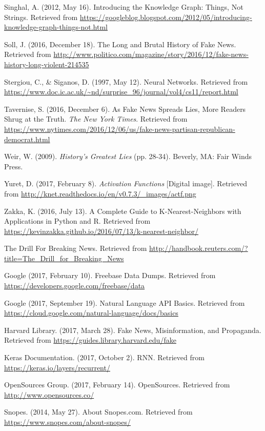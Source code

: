 \begin{thebibliography}{99}
Singhal, A. (2012, May 16). Introducing the Knowledge Graph: Things, Not Strings. Retrieved from \url{https://googleblog.blogspot.com/2012/05/introducing-knowledge-graph-things-not.html}

Soll, J. (2016, December 18). The Long and Brutal History of Fake News. Retrieved from \url{http://www.politico.com/magazine/story/2016/12/fake-news-history-long-violent-214535}

Stergiou, C., \& Siganos, D. (1997, May 12). Neural Networks. Retrieved from \url{https://www.doc.ic.ac.uk/~nd/surprise\_96/journal/vol4/cs11/report.html}

Tavernise, S. (2016, December 6). As Fake News Spreads Lies, More Readers Shrug at the Truth. \textit{The New York Times}. Retrieved from \url{https://www.nytimes.com/2016/12/06/us/fake-news-partisan-republican-democrat.html}

Weir, W. (2009). \textit{History's Greatest Lies} (pp. 28-34). Beverly, MA: Fair Winds Press.

Yuret, D. (2017, February 8). \textit{Activation Functions} [Digital image]. Retrieved from \url{http://knet.readthedocs.io/en/v0.7.3/\_images/actf.png}

Zakka, K. (2016, July 13). A Complete Guide to K-Nearest-Neighbors with Applications in Python and R. Retrieved from \url{https://kevinzakka.github.io/2016/07/13/k-nearest-neighbor/}

The Drill For Breaking News. Retrieved from \url{http://handbook.reuters.com/?title=The\_Drill\_for\_Breaking\_News}

Google (2017, February 10). Freebase Data Dumps. Retrieved from \url{https://developers.google.com/freebase/data}

Google (2017, September 19). Natural Language API Basics. Retrieved from \url{https://cloud.google.com/natural-language/docs/basics}

Harvard Library. (2017, March 28). Fake News, Misinformation, and Propaganda. Retrieved from \url{https://guides.library.harvard.edu/fake}

Keras Documentation. (2017, October 2). RNN. Retrieved from \url{https://keras.io/layers/recurrent/}

OpenSources Group. (2017, February 14). OpenSources. Retrieved from \url{http://www.opensources.co/}

Snopes. (2014, May 27). About Snopes.com. Retrieved from \url{https://www.snopes.com/about-snopes/}



\end{thebibliography}
